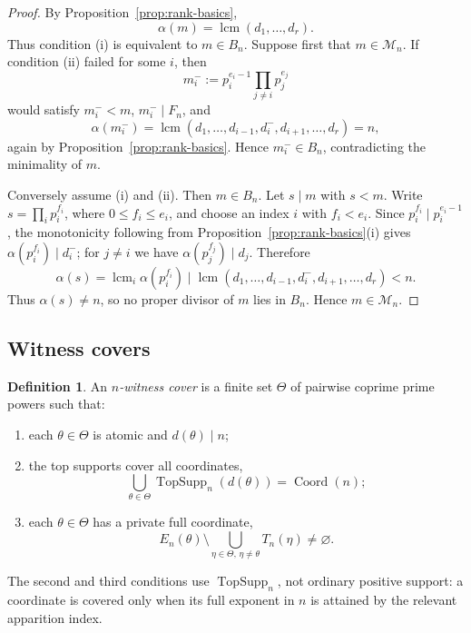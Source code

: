 \documentclass[11pt,letterpaper]{article}
\numberwithin{equation}{section}
\theoremstyle{plain}
\theoremstyle{definition}
\newtheorem{definition}[theorem]{Definition}
\theoremstyle{remark}
\DeclareMathOperator{\lcmop}{lcm}
\DeclareMathOperator{\Coord}{Coord}
\DeclareMathOperator{\TopSupp}{TopSupp}
\begin{document}
\begin{proof}
By Proposition~\ref{prop:rank-basics},
\[
\alpha(m)=\lcmop(d_1,\ldots,d_r).
\]
Thus condition \textup{(i)} is equivalent to \(m\in B_n\). Suppose first that
\(m\in\mathcal M_n\).  If condition \textup{(ii)} failed for some \(i\), then
\[
m_i^-:=p_i^{e_i-1}\prod_{j\ne i}p_j^{e_j}
\]
would satisfy \(m_i^-<m\), \(m_i^-\mid F_n\), and
\[
\alpha(m_i^-)=\lcmop(d_1,\ldots,d_{i-1},d_i^-,d_{i+1},\ldots,d_r)=n,
\]
again by Proposition~\ref{prop:rank-basics}. Hence \(m_i^-\in B_n\),
contradicting the minimality of \(m\).

Conversely assume \textup{(i)} and \textup{(ii)}. Then \(m\in B_n\). Let
\(s\mid m\) with \(s<m\). Write \(s=\prod_i p_i^{f_i}\), where
\(0\le f_i\le e_i\), and choose an index \(i\) with \(f_i<e_i\). Since
\(p_i^{f_i}\mid p_i^{e_i-1}\), the monotonicity following from
Proposition~\ref{prop:rank-basics}(i) gives
\(\alpha(p_i^{f_i})\mid d_i^-\); for \(j\ne i\) we have
\(\alpha(p_j^{f_j})\mid d_j\). Therefore
\[
\alpha(s)=\lcmop_i\alpha(p_i^{f_i})
\mid
\lcmop(d_1,\ldots,d_{i-1},d_i^-,d_{i+1},\ldots,d_r)<n.
\]
Thus \(\alpha(s)\ne n\), so no proper divisor of \(m\) lies in \(B_n\). Hence
\(m\in\mathcal M_n\).
\end{proof}

\subsection*{Witness covers}

\begin{definition}\label{def:witness-cover}
An \emph{\(n\)-witness cover} is a finite set \(\Theta\) of pairwise coprime
prime powers such that:
\begin{enumerate}[label=\textup{(\roman*)}]
\item each \(\theta\in\Theta\) is atomic and \(d(\theta)\mid n\);
\item the top supports cover all coordinates,
\[
\bigcup_{\theta\in\Theta}\TopSupp_n(d(\theta))=\Coord(n);
\]
\item each \(\theta\in\Theta\) has a private full coordinate,
\[
E_n(\theta)\setminus\bigcup_{\eta\in\Theta,\,\eta\ne\theta}T_n(\eta)
\ne\varnothing.
\]
\end{enumerate}
The second and third conditions use \(\TopSupp_n\), not ordinary positive
support: a coordinate is covered only when its full exponent in \(n\) is
attained by the relevant apparition index.
\end{definition}
\end{document}
